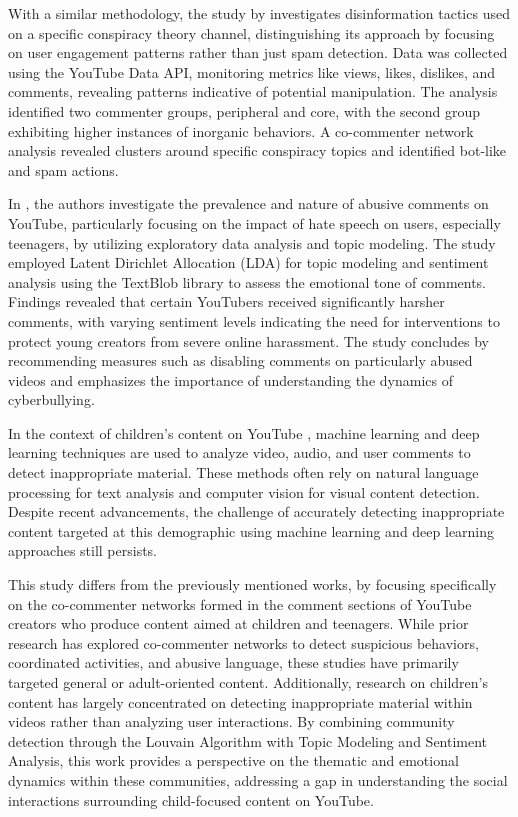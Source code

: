 \documentclass[12pt]{article}
\begin{document}
With a similar methodology, the study by \cite{hussain2018analyzing} investigates
disinformation tactics used on a specific conspiracy theory channel, distinguishing its approach by 
focusing on user engagement patterns rather than just spam detection. Data was collected using the 
YouTube Data API, monitoring metrics like views, likes, dislikes, and comments, revealing patterns 
indicative of potential manipulation. The analysis identified two commenter groups, peripheral and 
core, with the second group exhibiting higher instances of inorganic behaviors. A co-commenter network 
analysis revealed clusters around specific conspiracy topics and identified bot-like and spam actions. 

In \cite{shekar2021}, the authors investigate the prevalence and nature of abusive comments on YouTube, 
particularly focusing on the impact of hate speech on users, especially teenagers, by utilizing 
exploratory data analysis and topic modeling. 
The study employed Latent Dirichlet Allocation (LDA) for topic modeling and sentiment analysis using 
the TextBlob library to assess the emotional tone of comments. Findings revealed that certain 
YouTubers received significantly harsher comments, with varying sentiment levels indicating the 
need for interventions to protect young creators from severe online harassment. 
The study concludes by recommending measures such as disabling comments on particularly abused 
videos and emphasizes the importance of understanding the dynamics of cyberbullying.

In the context of children's content on YouTube \cite{app13064044}, machine learning and deep learning 
techniques are used to analyze video, audio, and user comments to detect inappropriate 
material. These methods often rely on natural language processing for text analysis and computer 
vision for visual content detection. 
Despite recent advancements, the challenge of accurately detecting inappropriate content targeted at 
this demographic using machine learning and deep learning approaches still persists.


This study differs from the previously mentioned works, by focusing specifically on the co-commenter 
networks formed in the comment sections of YouTube creators who produce content aimed at children and teenagers. 
While prior research has explored co-commenter networks to detect suspicious behaviors, coordinated activities, 
and abusive language, these studies have primarily targeted general or adult-oriented content. 
Additionally, research on children's content has largely concentrated on detecting inappropriate 
material within videos rather than analyzing user interactions. By combining community detection 
through the Louvain Algorithm with Topic Modeling and Sentiment Analysis, this work provides a 
perspective on the thematic and emotional dynamics within these communities, 
addressing a gap in understanding the social interactions surrounding child-focused content on YouTube.
\end{document}
